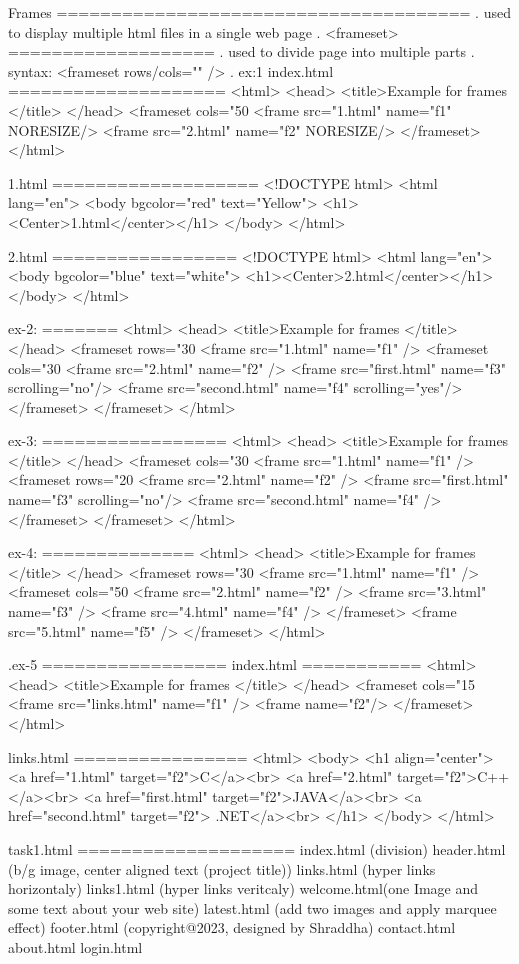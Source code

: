 Frames
======================================
. used to display multiple html files in a single web page
. <frameset>
===================
. used to divide page into multiple parts
. syntax: <frameset rows/cols="" />
. ex:1
index.html
====================
<html>
  <head>
    <title>Example for frames </title>
  </head>
  <frameset cols="50%
    <frame src="1.html" name="f1" NORESIZE/>
    <frame src="2.html" name="f2" NORESIZE/>
  </frameset>
</html>

1.html
===================
<!DOCTYPE html>
<html lang="en">
 <body bgcolor="red" text="Yellow">
  <h1><Center>1.html</center></h1>
 </body>
</html>

2.html
=================
<!DOCTYPE html>
<html lang="en">
 <body bgcolor="blue" text="white">
  <h1><Center>2.html</center></h1>
 </body>
</html>


ex-2:
=======
<html>
  <head>
    <title>Example for frames </title>
  </head>
  <frameset rows="30%
     <frame src="1.html" name="f1" />
	 <frameset cols="30%
	   <frame src="2.html"  name="f2" />
	   <frame src="first.html" name="f3" scrolling="no"/>
	   <frame src="second.html" name="f4" scrolling="yes"/>
	 </frameset>
  </frameset>
</html>

ex-3:
=================
<html>
  <head>
    <title>Example for frames </title>
  </head>
  <frameset cols="30%
     <frame src="1.html" name="f1" />
	 <frameset rows="20%
	    <frame src="2.html"  name="f2" />
		<frame src="first.html" name="f3" scrolling="no"/>
		<frame src="second.html" name="f4" />
	 </frameset>
  </frameset>
</html>

ex-4:
==============
<html>
  <head>
    <title>Example for frames </title>
  </head>
  <frameset rows="30%
    <frame src="1.html" name="f1" />
	<frameset cols="50%
	  <frame src="2.html" name="f2" />
	  <frame src="3.html" name="f3" />
	  <frame src="4.html" name="f4" />
	</frameset>
	<frame src="5.html" name="f5" />
  </frameset>
</html>


.ex-5
=================
index.html
===========
<html>
  <head>
    <title>Example for frames </title>
  </head>
  <frameset cols="15%
    <frame src="links.html" name="f1" />
	<frame name="f2"/>
  </frameset>
</html>

links.html
================
<html>
 <body>
   <h1 align="center">
   <a href="1.html" target="f2">C</a><br>
   <a href="2.html" target="f2">C++</a><br>
   <a href="first.html" target="f2">JAVA</a><br>
   <a href="second.html" target="f2"> .NET</a><br>
   </h1>
 </body>
</html>


task1.html
====================
index.html  (division)
header.html (b/g image, center aligned text (project title))
links.html  (hyper links horizontaly)
links1.html (hyper links veritcaly)
welcome.html(one Image and some text about your web site)
latest.html (add two images and apply marquee effect)
footer.html (copyright@2023, designed by Shraddha)
contact.html
about.html
login.html
